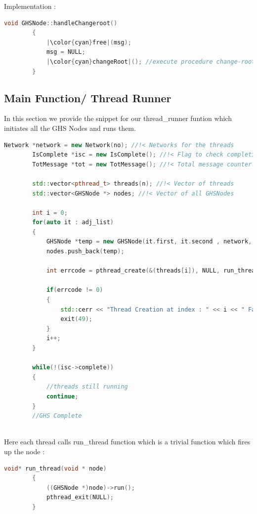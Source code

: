 \documentclass[letterpaper,11pt]{article}
\begin{document}
	\bigskip 
	
	Implementation : 
	
	
	\begin{lstlisting}[language=C++, caption= handleChangeroot()]
		void GHSNode::handleChangeroot()
		{
			|\color{cyan}free|(msg);
			msg = NULL;
			|\color{cyan}changeRoot|(); //execute procedure change-root()
		}
	\end{lstlisting}
	
	\hypertarget{s2d4}{\subsection{Main Function/ Thread Runner}}
	
	In this section we provide the snippet for our thread\_runner funtion which initiates all the GHS Nodes and runs them.
	
	\begin{lstlisting}[language=C++, caption= thread\_runner Sample]
		Network *network = new Network(no); //!< Networks for the threads
		IsComplete *isc = new IsComplete(); //!< Flag to check completion
		TotMessage *tot = new TotMessage(); //!< Total message counter
		
		std::vector<pthread_t> threads(n); //!< Vector of threads
		std::vector<GHSNode *> nodes; //!< Vector of all GHSNodes
		
		int i = 0;
		for(auto it : adj_list)
		{
			GHSNode *temp = new GHSNode(it.first, it.second , network, isc, tot); //!< Create new GHSNode
			nodes.push_back(temp); 
			
			int errcode = pthread_create(&(threads[i]), NULL, run_thread, (void *)temp); //!< Start the thread, if errcode != 0 then thread creation was not successful
			
			if(errcode != 0)
			{
				std::cerr << "Thread Creation at index : " << i << " Failed.\n Exiting.... " << std::endl;
				exit(49);
			}
			i++;
		}
		
		while(!(isc->complete))
		{
			//threads still running
			continue;
		}
		//GHS Complete
		
	\end{lstlisting}
	
	Here each thread calls run\_thread function which is a trivial function which fires up the node :
	
	\begin{lstlisting}[language=C++, caption= run\_thread()]
		void* run_thread(void * node)
		{ 
			((GHSNode *)node)->run();
			pthread_exit(NULL);
		}
	\end{lstlisting}
	
\end{document}
